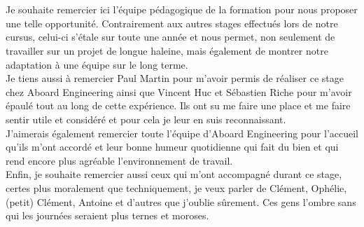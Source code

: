 \thispagestyle{empty}
\chapter*{}
\begin{flushright}
  \begin{minipage}[t]{0.6\textwidth}
	Je souhaite remercier ici l'équipe pédagogique de la formation pour nous
	proposer une telle opportunité. Contrairement aux autres stages
	effectués lors de notre cursus, celui-ci s'étale sur toute une année et nous
	permet, non seulement de travailler sur un projet de longue haleine, mais
	également de montrer notre adaptation à une équipe sur le long terme.\\

	Je tiens aussi à remercier Paul {\sc Martin} pour m'avoir permis de réaliser
	ce stage chez Aboard Engineering ainsi que Vincent {\sc Huc} et Sébastien
	{\sc Riche} pour m'avoir épaulé tout au long de cette expérience. Ils ont su
	me faire une place et me faire sentir utile et considéré et pour cela je leur
	en suis reconnaissant.\\
	J'aimerais également remercier toute l'équipe d'Aboard Engineering pour
	l'accueil qu'ils m'ont accordé et leur bonne humeur quotidienne qui fait du
	bien et qui rend encore plus agréable l'environnement de travail.\\

	Enfin, je souhaite remercier aussi ceux qui m'ont accompagné durant ce
	stage, certes plus moralement que techniquement, je veux parler de Clément,
	Ophélie, (petit) Clément, Antoine et d'autres que j'oublie sûrement. Ces gens
	l'ombre sans qui les journées seraient plus ternes et moroses.
  \end{minipage}
\end{flushright}
